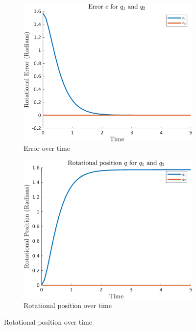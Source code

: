\documentclass{article}
\begin{document}
\begin{figure}[H]
    \centering
    \begin{subfigure}{0.325\textwidth}
        \centering
        \includegraphics[width = \textwidth]{figures/error-c2.png}
        \caption{Error over time}
    \end{subfigure}
    \begin{subfigure}{0.325\textwidth}
        \centering
        \includegraphics[width = \textwidth]{figures/rotational-position-c2.png}
        \caption{Rotational position over time}
    \end{subfigure}

\end{figure}
\end{document}
